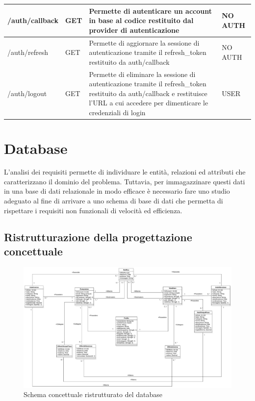 \begin{longtable}{|C{5.2cm}|C{1.7cm}|L{5.2cm}|L{2.6cm}|}
                \hline
                    /auth/callback
                    & GET
                    & Permette di autenticare un account in base al codice restituito dal provider di autenticazione
                    & NO AUTH \\
                \hline
                    /auth/refresh
                    & GET
                    & Permette di aggiornare la sessione di autenticazione tramite il refresh\_token restituito da auth/callback
                    & NO AUTH \\
                \hline
                    /auth/logout
                    & GET
                    & Permette di eliminare la sessione di autenticazione tramite il refresh\_token restituito da auth/callback e restituisce l'URL a cui accedere per dimenticare le credenziali di login
                    & USER \\
                \hline
            \end{longtable}

    \clearpage
    
    \section{Database}
        L'analisi dei requisiti permette di individuare le entità, relazioni ed attributi che caratterizzano il dominio del problema. Tuttavia, per immagazzinare questi dati in una base di dati relazionale in modo efficace è necessario fare uno studio adeguato al fine di arrivare a uno schema di base di dati che permetta di rispettare i requisiti non funzionali di velocità ed efficienza.
    
        \subsection{Ristrutturazione della progettazione concettuale}
            \begin{figure}[htbp!]
                \centering
                    \includegraphics[width=0.73\linewidth]{Immagini/Diagrammi/Class Diagram/Design/ClassDiagramDatabaseRistrutturato.pdf}
                \caption{Schema concettuale ristrutturato del database}
                \label{fig:Schema concettuale ristrutturato del database}
            \end{figure}
            
